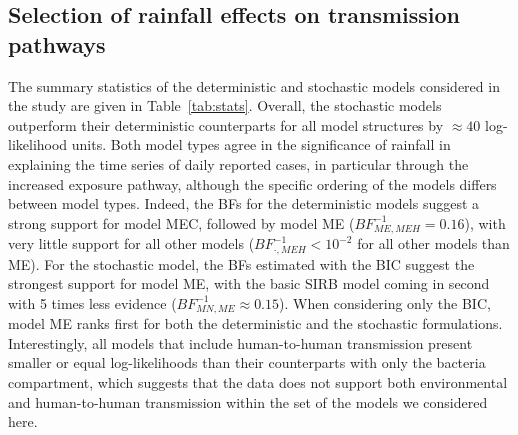 \subsection{Selection of rainfall effects on transmission pathways}
The summary statistics of the deterministic and stochastic models considered in the study are given in Table~\ref{tab:stats}. Overall, the stochastic models outperform their deterministic counterparts for all model structures by $\approx 40$ log-likelihood units. Both model types agree in the significance of rainfall in explaining the time series of daily reported cases, in particular through the increased exposure pathway, although the specific ordering of the models differs between model types. Indeed, the BFs for the deterministic models suggest a strong support for model \textsc{MEC}, followed by model \textsc{ME} ($BF^{-1}_{ME,MEH} = 0.16$), with very little support for all other models ($BF^{-1}_{\boldsymbol{\cdot},MEH}< 10^{-2}$ for all other models than ME). For the stochastic model, the BFs estimated with the BIC suggest the strongest support for model \textsc{ME}, with the basic SIRB model coming in second with 5 times less evidence ($BF^{-1}_{MN,ME} \approx 0.15$). When considering only the BIC, model \textsc{ME} ranks first for both the deterministic and the stochastic formulations. Interestingly, all models that include human-to-human transmission present smaller or equal log-likelihoods than their counterparts with only the bacteria compartment, which suggests that the data does not support both environmental and human-to-human transmission within the set of the models we considered here.


